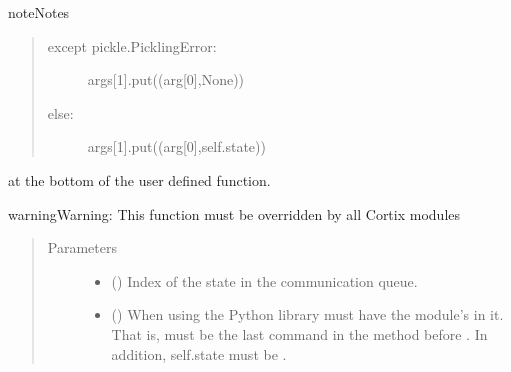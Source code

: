 \documentclass[letterpaper,10pt,openany,oneside,english]{sphinxmanual}
\begin{document}
\begin{fulllineitems}
\begin{fulllineitems}
\begin{sphinxadmonition}{note}{Notes}
\begin{quote}
\begin{description}
\begin{description}
\item[{except pickle.PicklingError:}] \leavevmode
args{[}1{]}.put((arg{[}0{]},None))

\item[{else:}] \leavevmode
args{[}1{]}.put((arg{[}0{]},self.state))

\end{description}

\end{description}
\end{quote}

at the bottom of the user defined  function.
\end{sphinxadmonition}

\begin{sphinxadmonition}{warning}{Warning:}
This function must be overridden by all Cortix modules
\end{sphinxadmonition}
\begin{quote}\begin{description}
\item[{Parameters}] \leavevmode\begin{itemize}
\item {} 
\sphinxstyleliteralstrong{\sphinxupquote{{[}}}\sphinxstyleliteralstrong{\sphinxupquote{{]}}} () \textendash{} Index of the state in the communication queue.

\item {} 
\sphinxstyleliteralstrong{\sphinxupquote{{[}}}\sphinxstyleliteralstrong{\sphinxupquote{{]}}} () \textendash{} When using the Python  library  must have
the module’s  in it. That is,
 must be the last command in the
method before . In addition, self.state must be .

\end{itemize}

\end{description}\end{quote}

\end{fulllineitems}


\end{fulllineitems}
\end{document}
